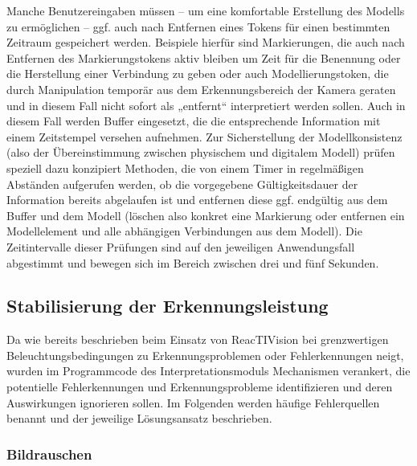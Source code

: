 Manche Benutzereingaben müssen -- um eine komfortable Erstellung des Modells zu ermöglichen -- ggf. auch nach Entfernen eines Tokens für einen bestimmten Zeitraum gespeichert werden. Beispiele hierfür sind Markierungen, die auch nach Entfernen des Markierungstokens aktiv bleiben um Zeit für die Benennung oder die Herstellung einer Verbindung zu geben oder auch Modellierungstoken, die durch Manipulation temporär aus dem Erkennungsbereich der Kamera geraten und in diesem Fall nicht sofort als „entfernt“ interpretiert werden sollen. Auch in diesem Fall werden Buffer eingesetzt, die die entsprechende Information mit einem Zeitstempel versehen aufnehmen. Zur Sicherstellung der Modellkonsistenz (also der Übereinstimmung zwischen physischem und digitalem Modell) prüfen speziell dazu konzipiert Methoden, die von einem Timer in regelmäßigen Abständen aufgerufen werden, ob die vorgegebene Gültigkeitsdauer der Information bereits abgelaufen ist und entfernen diese ggf. endgültig aus dem Buffer und dem Modell (löschen also konkret eine Markierung oder entfernen ein Modellelement und alle abhängigen Verbindungen aus dem Modell). Die Zeitintervalle dieser Prüfungen sind auf den jeweiligen Anwendungsfall abgestimmt und bewegen sich im Bereich zwischen drei und fünf Sekunden.


\subsection{Stabilisierung der Erkennungsleistung} %
\label{sub:stabilisierung_der_erkennungsleistung}

Da wie bereits beschrieben beim Einsatz von ReacTIVision bei grenzwertigen Beleuchtungsbedingungen zu Erkennungsproblemen oder Fehlerkennungen neigt, wurden im Programmcode des Interpretationsmoduls Mechanismen verankert, die potentielle Fehlerkennungen und Erkennungsprobleme identifizieren und deren Auswirkungen ignorieren sollen. Im Folgenden werden häufige Fehlerquellen benannt und der jeweilige Lösungsansatz beschrieben.

\subsubsection{Bildrauschen} %
\label{ssub:bildrauschen}


